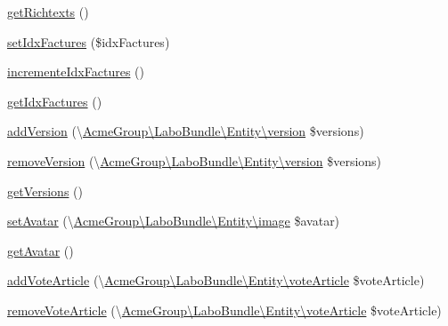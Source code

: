 \begin{DoxyCompactItemize}
\hyperlink{class_acme_group_1_1_user_bundle_1_1_entity_1_1_user_afe045caa1db50ba4fcab983f224b554a}{get\+Richtexts} ()
\item 
\hyperlink{class_acme_group_1_1_user_bundle_1_1_entity_1_1_user_a2f9759200472d05c266dd2cb2570a723}{set\+Idx\+Factures} (\$idx\+Factures)
\item 
\hyperlink{class_acme_group_1_1_user_bundle_1_1_entity_1_1_user_ae22f754a7847264bf7014aa0ec8616ae}{incremente\+Idx\+Factures} ()
\item 
\hyperlink{class_acme_group_1_1_user_bundle_1_1_entity_1_1_user_a8f409c389d61d9514535e6d5b23df77a}{get\+Idx\+Factures} ()
\item 
\hyperlink{class_acme_group_1_1_user_bundle_1_1_entity_1_1_user_ae7a70024664b1f9ca2374407c0d69e23}{add\+Version} (\textbackslash{}\hyperlink{class_acme_group_1_1_labo_bundle_1_1_entity_1_1version}{Acme\+Group\textbackslash{}\+Labo\+Bundle\textbackslash{}\+Entity\textbackslash{}version} \$versions)
\item 
\hyperlink{class_acme_group_1_1_user_bundle_1_1_entity_1_1_user_ad8ada5799ed20a3f4cb26197688ebb5a}{remove\+Version} (\textbackslash{}\hyperlink{class_acme_group_1_1_labo_bundle_1_1_entity_1_1version}{Acme\+Group\textbackslash{}\+Labo\+Bundle\textbackslash{}\+Entity\textbackslash{}version} \$versions)
\item 
\hyperlink{class_acme_group_1_1_user_bundle_1_1_entity_1_1_user_a9130a8c3a43f6c907ada09f1ccfc49f1}{get\+Versions} ()
\item 
\hyperlink{class_acme_group_1_1_user_bundle_1_1_entity_1_1_user_a3e26555fe9355e4d50d6ecd8af8ced31}{set\+Avatar} (\textbackslash{}\hyperlink{class_acme_group_1_1_labo_bundle_1_1_entity_1_1image}{Acme\+Group\textbackslash{}\+Labo\+Bundle\textbackslash{}\+Entity\textbackslash{}image} \$avatar)
\item 
\hyperlink{class_acme_group_1_1_user_bundle_1_1_entity_1_1_user_aee11b1b7c817e129d6eda8b968860c9d}{get\+Avatar} ()
\item 
\hyperlink{class_acme_group_1_1_user_bundle_1_1_entity_1_1_user_a0182497b73f0f211cf90f16f8363db41}{add\+Vote\+Article} (\textbackslash{}\hyperlink{class_acme_group_1_1_labo_bundle_1_1_entity_1_1vote_article}{Acme\+Group\textbackslash{}\+Labo\+Bundle\textbackslash{}\+Entity\textbackslash{}vote\+Article} \$vote\+Article)
\item 
\hyperlink{class_acme_group_1_1_user_bundle_1_1_entity_1_1_user_ad12ea725ebb2703edcef3184de85c4d7}{remove\+Vote\+Article} (\textbackslash{}\hyperlink{class_acme_group_1_1_labo_bundle_1_1_entity_1_1vote_article}{Acme\+Group\textbackslash{}\+Labo\+Bundle\textbackslash{}\+Entity\textbackslash{}vote\+Article} \$vote\+Article)

\end{DoxyCompactItemize}
